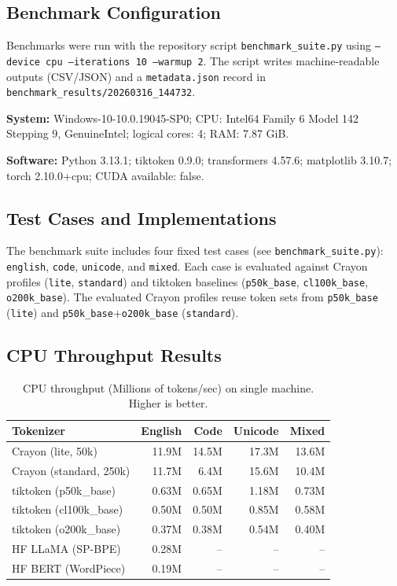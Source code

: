 \documentclass[11pt,a4paper,twocolumn]{article}
\begin{document}
\subsection{Benchmark Configuration}

Benchmarks were run with the repository script \texttt{benchmark\_suite.py} using \texttt{--device cpu --iterations 10 --warmup 2}. The script writes machine-readable outputs (CSV/JSON) and a \texttt{metadata.json} record in \texttt{benchmark\_results/20260316\_144732}.

\textbf{System:} Windows-10-10.0.19045-SP0; CPU: Intel64 Family 6 Model 142 Stepping 9, GenuineIntel; logical cores: 4; RAM: 7.87 GiB.

\textbf{Software:} Python 3.13.1; tiktoken 0.9.0; transformers 4.57.6; matplotlib 3.10.7; torch 2.10.0+cpu; CUDA available: false.

\subsection{Test Cases and Implementations}

The benchmark suite includes four fixed test cases (see \texttt{benchmark\_suite.py}): \texttt{english}, \texttt{code}, \texttt{unicode}, and \texttt{mixed}. Each case is evaluated against Crayon profiles (\texttt{lite}, \texttt{standard}) and tiktoken baselines (\texttt{p50k\_base}, \texttt{cl100k\_base}, \texttt{o200k\_base}). The evaluated Crayon profiles reuse token sets from \texttt{p50k\_base} (\texttt{lite}) and \texttt{p50k\_base}+\texttt{o200k\_base} (\texttt{standard}).

\subsection{CPU Throughput Results}

\begin{table}[t]
\centering
\caption{CPU throughput (Millions of tokens/sec) on single machine. Higher is better.}
\small
\begin{tabular}{@{}lrrrr@{}}
\toprule
\textbf{Tokenizer} & \textbf{English} & \textbf{Code} & \textbf{Unicode} & \textbf{Mixed} \\
\midrule
Crayon (lite, 50k) & 11.9M & 14.5M & 17.3M & 13.6M \\
Crayon (standard, 250k) & 11.7M & 6.4M & 15.6M & 10.4M \\
tiktoken (p50k\_base) & 0.63M & 0.65M & 1.18M & 0.73M \\
tiktoken (cl100k\_base) & 0.50M & 0.50M & 0.85M & 0.58M \\
tiktoken (o200k\_base) & 0.37M & 0.38M & 0.54M & 0.40M \\
HF LLaMA (SP-BPE) & 0.28M & -- & -- & -- \\
HF BERT (WordPiece) & 0.19M & -- & -- & -- \\
\bottomrule
\end{tabular}
\label{tab:throughput}
\end{table}
\end{document}
